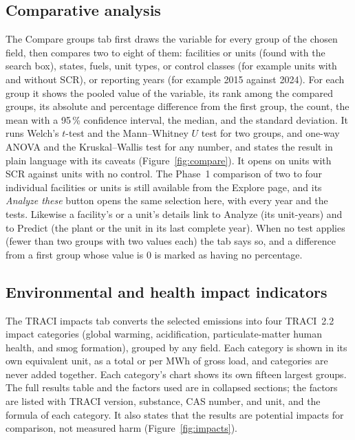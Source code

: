 \documentclass[11pt,a4paper]{article}
\begin{document}
\subsection{Comparative analysis}

The Compare groups tab first draws the variable for every group of the chosen field, then
compares two to eight of them: facilities or units (found with the search box), states, fuels,
unit types, \NOx{} or \SOtwo{} control classes (for example units with and without SCR), or reporting
years (for example 2015 against 2024). For each group it shows the pooled value of the variable,
its rank among the compared groups, its absolute and percentage difference from the first
group, the count, the mean with a 95\,\% confidence interval, the median, and the standard
deviation. It runs Welch's $t$-test and the Mann--Whitney $U$ test for two groups, and one-way
ANOVA and the Kruskal--Wallis test for any number, and states the result in plain language with
its caveats (Figure~\ref{fig:compare}). It opens on units with SCR against units with no \NOx{}
control. The Phase~1 comparison of two to four individual facilities or units is still
available from the Explore page, and its \emph{Analyze these} button opens the same selection
here, with every year and the tests. Likewise a facility's or a unit's details link to Analyze
(its unit-years) and to Predict (the plant or the unit in its last complete year). When no test
applies (fewer than two groups with two values each) the tab says so, and a difference from a
first group whose value is 0 is marked as having no percentage.

\subsection{Environmental and health impact indicators}

The TRACI impacts tab converts the selected emissions into four TRACI~2.2 impact categories (global
warming, acidification, particulate-matter human health, and smog formation), grouped by any
field. Each category is shown in its own equivalent unit, as a total or per MWh of gross load,
and categories are never added together. Each category's chart shows its own fifteen largest
groups. The full results table and the factors used are in collapsed sections; the factors are
listed with TRACI version,
substance, CAS number, and unit, and the formula of each category. It also states that the
results are potential impacts for comparison, not measured harm (Figure~\ref{fig:impacts}).
\end{document}
